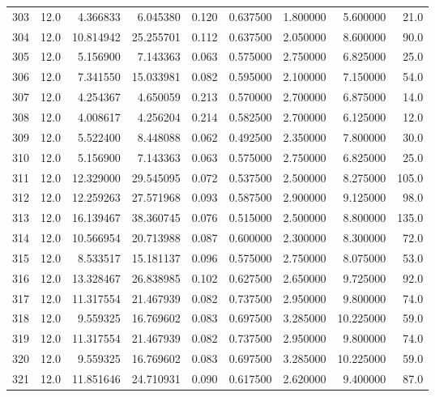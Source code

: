 \begin{tabular}{lrrrrrrrr}
303  &   12.0 &   4.366833 &   6.045380 &  0.120 &  0.637500 &  1.800000 &   5.600000 &   21.0 \\
304  &   12.0 &  10.814942 &  25.255701 &  0.112 &  0.637500 &  2.050000 &   8.600000 &   90.0 \\
305  &   12.0 &   5.156900 &   7.143363 &  0.063 &  0.575000 &  2.750000 &   6.825000 &   25.0 \\
306  &   12.0 &   7.341550 &  15.033981 &  0.082 &  0.595000 &  2.100000 &   7.150000 &   54.0 \\
307  &   12.0 &   4.254367 &   4.650059 &  0.213 &  0.570000 &  2.700000 &   6.875000 &   14.0 \\
308  &   12.0 &   4.008617 &   4.256204 &  0.214 &  0.582500 &  2.700000 &   6.125000 &   12.0 \\
309  &   12.0 &   5.522400 &   8.448088 &  0.062 &  0.492500 &  2.350000 &   7.800000 &   30.0 \\
310  &   12.0 &   5.156900 &   7.143363 &  0.063 &  0.575000 &  2.750000 &   6.825000 &   25.0 \\
311  &   12.0 &  12.329000 &  29.545095 &  0.072 &  0.537500 &  2.500000 &   8.275000 &  105.0 \\
312  &   12.0 &  12.259263 &  27.571968 &  0.093 &  0.587500 &  2.900000 &   9.125000 &   98.0 \\
313  &   12.0 &  16.139467 &  38.360745 &  0.076 &  0.515000 &  2.500000 &   8.800000 &  135.0 \\
314  &   12.0 &  10.566954 &  20.713988 &  0.087 &  0.600000 &  2.300000 &   8.300000 &   72.0 \\
315  &   12.0 &   8.533517 &  15.181137 &  0.096 &  0.575000 &  2.750000 &   8.075000 &   53.0 \\
316  &   12.0 &  13.328467 &  26.838985 &  0.102 &  0.627500 &  2.650000 &   9.725000 &   92.0 \\
317  &   12.0 &  11.317554 &  21.467939 &  0.082 &  0.737500 &  2.950000 &   9.800000 &   74.0 \\
318  &   12.0 &   9.559325 &  16.769602 &  0.083 &  0.697500 &  3.285000 &  10.225000 &   59.0 \\
319  &   12.0 &  11.317554 &  21.467939 &  0.082 &  0.737500 &  2.950000 &   9.800000 &   74.0 \\
320  &   12.0 &   9.559325 &  16.769602 &  0.083 &  0.697500 &  3.285000 &  10.225000 &   59.0 \\
321  &   12.0 &  11.851646 &  24.710931 &  0.090 &  0.617500 &  2.620000 &   9.400000 &   87.0 \\

\end{tabular}
